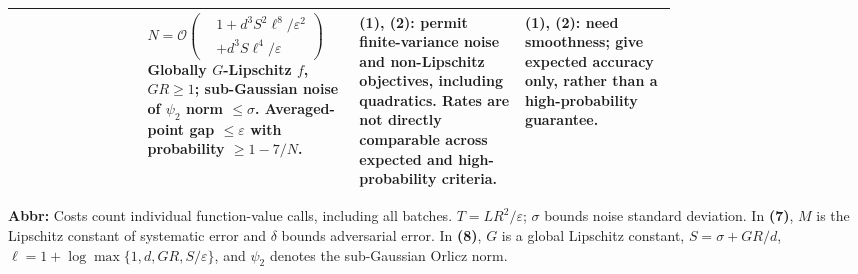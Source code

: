 \begin{table}[tp]
\begin{threeparttable}
\begin{tabularx}{\linewidth}{@{}>{\raggedright\arraybackslash}p{0.20\linewidth}>{\raggedright\arraybackslash}p{0.32\linewidth}>{\raggedright\arraybackslash}p{0.25\linewidth}>{\raggedright\arraybackslash}X@{}}
& $N=\mathcal{O}\!\left(\begin{aligned}&1+d^3S^2\ell^8/\varepsilon^2\\&+d^3S\ell^4/\varepsilon\end{aligned}\right)$\newline Globally $G$-Lipschitz $f$, $GR\ge1$; sub-Gaussian noise of $\psi_2$ norm $\le\sigma$. Averaged-point gap $\le\varepsilon$ with probability $\ge1-7/N$.
& \textbf{(1)}, \textbf{(2)}: permit finite-variance noise and non-Lipschitz objectives, including quadratics. Rates are not directly comparable across expected and high-probability criteria.
& \textbf{(1)}, \textbf{(2)}: need smoothness; give expected accuracy only, rather than a high-probability guarantee.
\\
\bottomrule
\end{tabularx}
\begin{tablenotes}[flushleft]\footnotesize
\item[] \textbf{Abbr:} Costs count individual function-value calls, including all batches. $T=LR^2/\varepsilon$; $\sigma$ bounds noise standard deviation. In \textbf{(7)}, $M$ is the Lipschitz constant of systematic error and $\delta$ bounds adversarial error. In \textbf{(8)}, $G$ is a global Lipschitz constant, $S=\sigma+GR/d$, $\ell=1+\log\max\{1,d,GR,S/\varepsilon\}$, and $\psi_2$ denotes the sub-Gaussian Orlicz norm.
\end{tablenotes}
\end{threeparttable}
\end{table}
\clearpage
